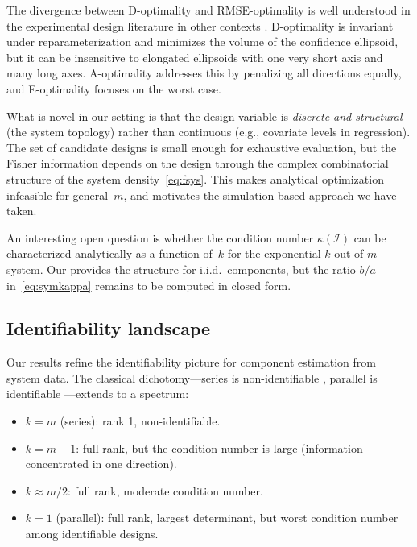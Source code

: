 \documentclass[12pt]{article}
\theoremstyle{definition}
\theoremstyle{remark}
\begin{document}
The divergence between D-optimality and RMSE-optimality is well
understood in the experimental design literature in other contexts
\citep{Pukelsheim2006, Atkinson2007}.  D-optimality is invariant
under reparameterization and minimizes the volume of the confidence
ellipsoid, but it can be insensitive to elongated ellipsoids with one
very short axis and many long axes.  A-optimality addresses this by
penalizing all directions equally, and E-optimality focuses on the
worst case.

What is novel in our setting is that the design variable is
\emph{discrete and structural} (the system topology) rather than
continuous (e.g., covariate levels in regression).  The set of
candidate designs is small enough for exhaustive evaluation, but the
Fisher information depends on the design through the complex
combinatorial structure of the system density~\eqref{eq:fsys}.  This
makes analytical optimization infeasible for general~$m$, and
motivates the simulation-based approach we have taken.

An interesting open question is whether the condition number
$\kappa(\mathcal{I})$ can be characterized analytically as a function
of~$k$ for the exponential $k$-out-of-$m$ system.  Our
 provides the structure for i.i.d.\ components,
but the ratio $b/a$ in~\eqref{eq:symkappa} remains to be computed in
closed form.


\subsection{Identifiability landscape}
\label{sec:ident_landscape}

Our results refine the identifiability picture for component
estimation from system data.  The classical dichotomy---series is
non-identifiable \citep{Tsiatis1975}, parallel is identifiable
\citep{BasuGhosh1978}---extends to a spectrum:
\begin{itemize}
  \item $k = m$ (series): rank 1, non-identifiable.
  \item $k = m - 1$: full rank, but the condition number is large
    (information concentrated in one direction).
  \item $k \approx m/2$: full rank, moderate condition number.
  \item $k = 1$ (parallel): full rank, largest determinant, but worst
    condition number among identifiable designs.
\end{itemize}
\end{document}
